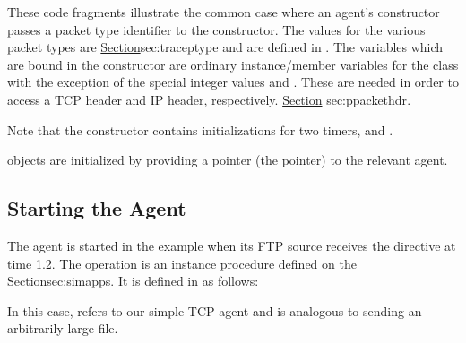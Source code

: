 These code fragments illustrate the common case where an agent's
constructor passes a packet type identifier to the 
constructor.
The values for the various packet types are
\href{used by the packet tracing facility}{Section}{sec:traceptype}
and are defined in .
The variables which are bound in the  constructor
are ordinary instance/member variables for the class
with the exception of the special integer values 
and .
These are needed in order to access a TCP header and IP header, respectively.
\href{Additional details are in the section on packet headers}{Section}{%
        sec:ppackethdr}.

Note that the  constructor contains initializations for
two timers,  and .

objects are initialized by providing a pointer (the  pointer) to
the relevant agent.

\subsection{Starting the Agent}
\label{sec:starttcp}

The  agent is started in the example when its
FTP source receives the  directive at time 1.2.
The  operation is an instance procedure defined on the
\href{class Application/FTP}{Section}{sec:simapps}.
It is defined in  as follows:
In this case,  refers to our simple TCP agent and
 is analogous to sending an arbitrarily large file.


